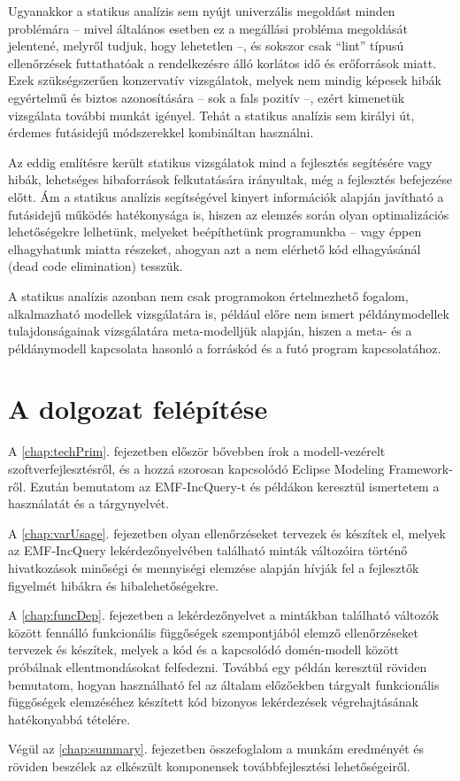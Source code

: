 Ugyanakkor a statikus analízis sem nyújt univerzális megoldást minden problémára -- mivel általános esetben ez a megállási probléma megoldását jelentené, melyről tudjuk, hogy lehetetlen --, és sokszor csak ``lint'' típusú ellenőrzések futtathatóak a rendelkezésre álló korlátos idő és erőforrások miatt.
Ezek szükségszerűen konzervatív vizsgálatok, melyek nem mindig képesek hibák egyértelmű és biztos azonosítására -- sok a fals pozitív --, ezért kimenetük vizsgálata további munkát igényel.
Tehát a statikus analízis sem királyi út, érdemes futásidejű módszerekkel kombináltan használni.

Az eddig említésre került statikus vizsgálatok mind a fejlesztés segítésére vagy hibák, lehetséges hibaforrások felkutatására irányultak, még a fejlesztés befejezése előtt.
Ám a statikus analízis segítségével kinyert információk alapján javítható a futásidejű működés hatékonysága is, hiszen az elemzés során olyan optimalizációs lehetőségekre lelhetünk, melyeket beépíthetünk programunkba -- vagy éppen elhagyhatunk miatta részeket, ahogyan azt a nem elérhető kód elhagyásánál (dead code elimination) tesszük.

A statikus analízis azonban nem csak programokon értelmezhető fogalom, alkalmazható modellek vizsgálatára is, például előre nem ismert példánymodellek tulajdonságainak vizsgálatára meta-modelljük alapján, hiszen a meta- és a példánymodell kapcsolata hasonló a forráskód és a futó program kapcsolatához.

\section{A dolgozat felépítése}


A \ref{chap:techPrim}. fejezetben először bővebben írok a modell-vezérelt szoftverfejlesztésről, és a hozzá szorosan kapcsolódó Eclipse Modeling Framework-ről.
Ezután bemutatom az EMF-IncQuery-t és példákon keresztül ismertetem a használatát és a tárgynyelvét.

A \ref{chap:varUsage}. fejezetben olyan ellenőrzéseket tervezek és készítek el, melyek az EMF-IncQuery lekérdezőnyelvében található minták változóira történő hivatkozások minőségi és mennyiségi elemzése alapján hívják fel a fejlesztők figyelmét hibákra és hibalehetőségekre.

A \ref{chap:funcDep}. fejezetben a lekérdezőnyelvet a mintákban található változók között fennálló funkcionális függőségek szempontjából elemző ellenőrzéseket tervezek és készítek, melyek a kód és a kapcsolódó domén-modell között próbálnak ellentmondásokat felfedezni.
Továbbá egy példán keresztül röviden bemutatom, hogyan használható fel az általam előzőekben tárgyalt funkcionális függőségek elemzéséhez készített kód bizonyos lekérdezések végrehajtásának hatékonyabbá tételére.

Végül az \ref{chap:summary}. fejezetben összefoglalom a munkám eredményét és röviden beszélek az elkészült komponensek továbbfejlesztési lehetőségeiről.
